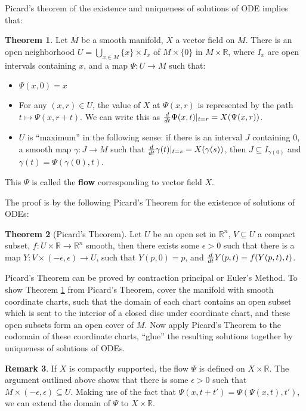 \documentclass{article}
\theoremstyle{definition}
\newtheorem{thm}{Theorem}[section]
\newtheorem{rmk}[thm]{Remark}
\begin{document}
Picard's theorem of the existence and uniqueness of solutions of ODE implies that:

\begin{thm}\label{flow}
    Let $M$ be a smooth manifold, $X$ a vector field on $M$. There is an open neighborhood $U=\bigcup_{x\in M}\{x\}\times I_x$ of $M\times \{0\}$ in $M\times \mathbb{R}$, where $I_x$ are open intervals containing $x$, and a map $\Psi: U\rightarrow M$ such that:
    \begin{itemize}
        \item $\Psi(x, 0)=x$
        \item For any $(x, r)\in U$, the value of $X$ at $\Psi(x, r)$ is represented by the path $t\mapsto \Psi(x, r+t)$. We can write this as ${d\over dt}\Psi(x, t)|_{t=r}=X(\Psi(x, r))$.
        \item $U$ is ``maximum'' in the following sense: if there is an interval $J$ containing $0$, a smooth map $\gamma: J\rightarrow M$ such that ${d\over dt}\gamma(t)|_{t=s}=X(\gamma(s))$, then $J\subseteq I_{\gamma(0)}$ and $\gamma(t)=\Psi(\gamma(0), t)$.
    \end{itemize}
    This $\Psi$ is called the {\bf flow} corresponding to vector field $X$.
\end{thm}

The proof is by the following Picard's Theorem for the existence of solutions of ODEs:

\begin{thm}[Picard's Theorem]
    Let $U$ be an open set in $\mathbb{R}^n$, $V\subseteq U$ a compact subset, $f: U\times\mathbb{R}\rightarrow\mathbb{R}^n$ smooth, then there exists some $\epsilon>0$ such that there is a map $Y: V\times(-\epsilon, \epsilon)\rightarrow U$, such that $Y(p, 0)=p$, and ${d\over dt}Y(p, t)=f(Y(p, t), t)$.
\end{thm}

Picard's Theorem can be proved by contraction principal or Euler's Method. To show Theorem \ref{flow} from Picard's Theorem, cover the manifold with smooth coordinate charts, such that the domain of each chart contains an open subset which is sent to the interior of a closed disc under coordinate chart, and these open subsets form an open cover of $M$. Now apply Picard's Theorem to the codomain of these coordinate charts, ``glue'' the resulting solutions together by uniqueness of solutions of ODEs.

\begin{rmk}
    If $X$ is compactly supported, the flow $\Psi$ is defined on $X\times\mathbb{R}$. The argument outlined above shows that there is some $\epsilon>0$ such that $M\times (-\epsilon, \epsilon)\subseteq U$. Making use of the fact that $\Psi(x, t+t')=\Psi(\Psi(x, t), t')$, we can extend the domain of $\Psi$ to $X\times\mathbb{R}$. 
\end{rmk}
\end{document}

